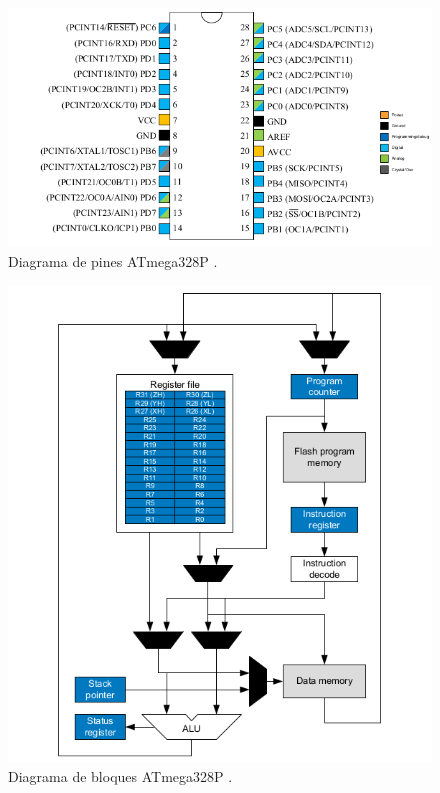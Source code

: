 \begin{figure}[H]
\centering
\includegraphics[scale=0.8]{./images/pines.png} 
\caption{Diagrama de pines ATmega328P \cite{atmega328P}.}
\label{f1}
\end{figure}

\begin{figure}[H]
\centering
\includegraphics[scale=0.8]{./images/bloques.png} 
\caption{Diagrama de bloques ATmega328P \cite{atmega328P}.  }
\label{f1}
\end{figure}